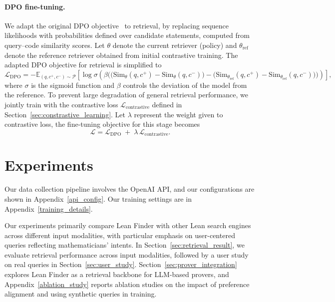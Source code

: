\documentclass{article} %
\begin{document}
\paragraph{DPO fine-tuning.}
We adapt the original DPO objective~\citep{rafailov2024directpreferenceoptimizationlanguage} to retrieval,
by replacing sequence likelihoods with probabilities defined over candidate statements, computed from query–code similarity scores.
Let $\theta$ denote the current retriever (policy) and $\theta_{\mathrm{ref}}$ denote the reference retriever obtained from initial contrastive training. The adapted DPO objective for retrieval is simplified to
{\small
\[
\mathcal{L}_{\mathrm{DPO}}
= - \mathbb{E}_{(q,c^{+},c^{-}) \sim \mathcal{P}}
\left[
\log \sigma \!\left(
\beta \Big(
\big(\mathrm{Sim}_\theta(q, c^{+}) - \mathrm{Sim}_\theta(q, c^{-})\big)
- 
\big(\mathrm{Sim}_{\theta_{\mathrm{ref}}}(q, c^{+}) - \mathrm{Sim}_{\theta_{\mathrm{ref}}}(q, c^{-})\big)
\Big)
\right)
\right],
\]
}
where $\sigma$ is the sigmoid function and $\beta$ controls the deviation of the model from the reference.
To prevent large degradation of general retrieval performance, we jointly train with the contrastive loss $\mathcal{L}_{\text{contrastive}}$ defined in Section~\ref{sec:constrastive_learning}. 
Let $\lambda$ represent the weight given to contrastive loss, the fine-tuning objective for this stage becomes
\[
\mathcal{L}
=
\mathcal{L}_{\mathrm{DPO}}
\;+\;
\lambda \,\mathcal{L}_{\mathrm{contrastive}}.
\]



\section{Experiments}
Our data collection pipeline involves the OpenAI API, and our configurations are shown in Appendix~\ref{api_config}.
Our training settings are in Appendix~\ref{training_details}.

Our experiments primarily compare Lean Finder with other Lean search engines across different input modalities, with particular emphasis on user-centered queries reflecting mathematicians' intents. In Section~\ref{sec:retrieval_result}, we evaluate retrieval performance across input modalities, followed by a user study on real queries in Section~\ref{sec:user_study}. Section~\ref{sec:prover_integration} explores Lean Finder as a retrieval backbone for LLM-based provers, and Appendix~\ref{ablation_study} reports ablation studies on the impact of preference alignment and using synthetic queries in training.
\end{document}
